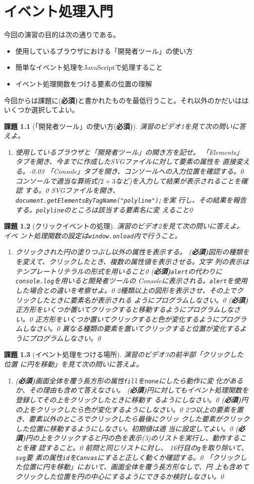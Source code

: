 \documentclass[a4j]{jreport}
\newtheorem{Report}{課題}
\newcommand{\Probs}[3]{%
 \begin{Report}[#1]\upshape
  #2
  \begin{enumerate}\upshape
  \ShowProbs#3\relax\relax
  \end{enumerate}
 \end{Report}
 }
\newcommand{\ShowProbs}[2]{\ifx#1\relax\else%
 \item #1\vspace{#2\textheight}\expandafter\ShowProbs\fi}
\newcommand{\changePage}[1]{
 \renewcommand{\thepage}{第\thechapter 回(#1)-\arabic{page}}
  \setcounter{page}{1}
}
\newcommand{\Must}{{(\bfseries 必須)}}
\begin{document}
\chapter{イベント処理入門}
\changePage{5/16}
今回の演習の目的は次の通りである。
\begin{itemize}
 \item 使用しているブラウザにおける「開発者ツール」の使い方
 \item 簡単なイベント処理をJavaScriptで処理すること
 \item イベント処理関数をつける要素の位置の理解
\end{itemize}
今回からは課題に\Must と書かれたものを最低行うこと。それ以外のかだいはは
いくつか選択してよい。
\Probs{「開発者ツール」の使い方\Must}{演習のビデオ1を見て次の問いに答えよ。}{
{使用しているブラウザと「開発者ツール」の開き方を記せ。}{0.05}
{「Elements」タブを開き、今までに作成したSVGファイルに対して要素の属性を
直接変える。\ignorespaces}{-0.03}
{「Console」タブを開き、コンソールへの入力位置を確認する。}{0}
{コンソールで適当な算術式($2+3$など)を入力して結果が表示されることを確認
する。}{0}
{SVGファイルを開き、
\newline\texttt{document.getElementsByTagName("polyline");}\newline を実
行し、その結果を報告する。\texttt{polyline}のところは該当する要素名に変
えること}{0}
}
\Probs{クリックイベントの処理}{演習のビデオ2を見て次の問いに答えよ。イベ
ント処理関数の設定は\texttt{window.onload}内で行うこと。}{
{クリックされた円の塗りつぶし以外の属性を表示する。}{0}
{\Must 図形の種類をを変えて、クリックしたとき、複数の属性値を表示させる。文字
列の表示はテンプレートリテラルの形式を用いること}{0}
{\Must\texttt{alert}の代わりに\texttt{console.log}を用いると開発者ツールの
Consoleに表示される。\texttt{alert}を使用した場合との違いを考察せよ。}{0}
{2種類以上の図形を表示させ、その上でクリックしたときに要素名が表示される
ようにプログラムしなさい。}{0}
{\Must 正方形をいくつか置いてクリックすると移動するようにプログラムしなさい。}{0}
{正方形をいくつか置いてクリックすると色が変化するようにプログラムしなさい。}{0}
{異なる種類の要素を置いてクリックすると位置が変化するようにプログラムしなさい。}{0}
}
\Probs{イベント処理をつける場所}{演習のビデオ3の前半部「クリックした位置
に円を移動」を見て次の問いに答えよ。}
{
{\Must 画面全体を覆う長方形の属性\texttt{fill}を\texttt{none}にしたら動作に変
化があるか、その理由も含めて答えなさい。}{0.07}
{\Must 円に対してもイベント処理関数を登録してその上をクリックしたときに移動す
るようにしなさい。}{0}
{\Must 円の上をクリックしたら色が変化するようにしなさい。}{0}
{2つ以上の要素を置き、要素以外のところでクリックしたら最後にクリッ
        クした要素がクリックした位置に移動するようにしなさい。初期値は適
        当に設定してよい。}{0}
{\Must 円の上をクリックすると円の色を表示(3)のリストを実行し、動作することを確
認すること。}{0}
{前問と同じリストに対し、 16行目の\texttt{g}を取り除いて、\texttt{svg}要
素の属性\texttt{id}を\texttt{Canvas}にすると正しく動くか確認する。}{0}
{「クリックした位置に円を移動」において、画面全体を覆う長方形なしで、円
上も含めてクリックした位置を円の中心にするようにできるか検討しなさい。}{0}
}
\end{document}
